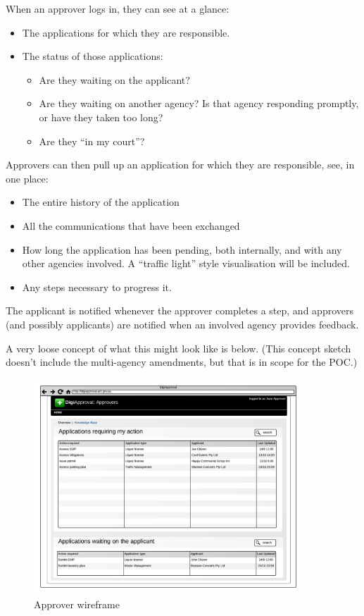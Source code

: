 \documentclass[12pt,a4paper,twosided]{article}
\begin{document}
When an approver logs in, they can see at a glance:

\begin{itemize}
\itemsep1pt\parskip0pt
\item
  The applications for which they are responsible.
\item
  The status of those applications:

  \begin{itemize}
  \itemsep1pt\parskip0pt
  \item
    Are they waiting on the applicant?
  \item
    Are they waiting on another agency? Is that agency responding
    promptly, or have they taken too long?
  \item
    Are they ``in my court''?
  \end{itemize}
\end{itemize}

Approvers can then pull up an application for which they are
responsible, see, in one place:

\begin{itemize}
\itemsep1pt\parskip0pt
\item
  The entire history of the application
\item
  All the communications that have been exchanged
\item
  How long the application has been pending, both internally, and with
  any other agencies involved. A ``traffic light'' style visualisation
  will be included.
\item
  Any steps necessary to progress it.
\end{itemize}

The applicant is notified whenever the approver completes a step, and
approvers (and possibly applicants) are notified when an involved agency
provides feedback.

A very loose concept of what this might look like is below. (This
concept sketch doesn't include the multi-agency amendments, but that is
in scope for the POC.)

\begin{figure}[htbp]
\centering
\includegraphics[width=0.9\textwidth]{./imgs/approver-wireframe.png}
\caption{Approver wireframe}
\end{figure}
\end{document}
